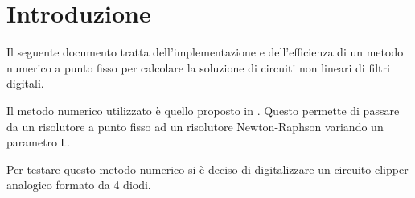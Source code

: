 \documentclass[12pt,a4paper,twoside,english,italian]{book}
\begin{document}
	\pagestyle{fancy} 
	\frontmatter
	\maketitle	

	\enlargethispage{-1.5\baselineskip}
	\tableofcontents

	\mainmatter

	\chapter*{Introduzione}
		Il seguente documento tratta dell'implementazione e dell'efficienza di un metodo numerico a punto fisso per calcolare la soluzione di circuiti non lineari di filtri digitali.
		
		Il metodo numerico utilizzato è quello proposto in \cite{bib:fixed-point}. Questo permette di passare da un risolutore a punto fisso ad un risolutore Newton-Raphson variando un parametro \texttt{L}.
		
		Per testare questo metodo numerico si è deciso di digitalizzare un circuito clipper analogico formato da 4 diodi.
		
		
	
\end{document}
